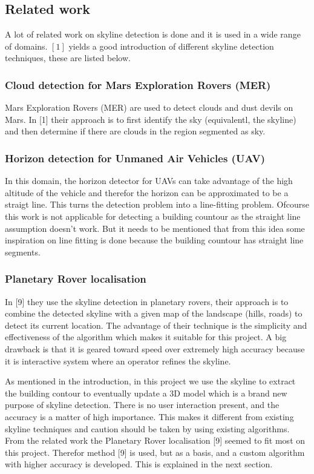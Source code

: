 \documentclass[10pt]{article}
\begin{document}
 \subsection{Related work}
A lot of related work on skyline detection is done and it is used in a wide
range of domains. $[1]$ yields a good introduction of different skyline
detection techniques, these are listed below.

\subsubsection{Cloud detection for Mars Exploration Rovers (MER)}
Mars Exploration Rovers (MER) are used to detect clouds and dust devils on Mars.
In [1] their approach is to first identify the sky (equivalentl, the skyline)
and then determine if there are clouds in the region segmented as sky.

\subsubsection{Horizon detection for Unmaned Air Vehicles (UAV)}
In this domain, the horizon detector for UAVs can take advantage of the high
altitude of the vehicle and therefor the horizon can be approximated to be a
straigt line.  This turns the detection problem into a line-fitting problem.
Ofcourse this work is not applicable for detecting a building countour as the
straight line assumption doesn't work. But it needs to be mentioned that from this
idea some inspiration on line fitting is done because the building countour has
straight line segments.

\subsubsection{Planetary Rover localisation}
In [9] they use the skyline detection in planetary rovers, their approach is to
combine the detected skyline with a given map of the landscape (hills, roads) to
detect its current location. 
The advantage of their technique is the simplicity and effectiveness of the
algorithm which makes it suitable for this project.  A big drawback is that it
is geared toward speed over extremely high accuracy because it is 
interactive system where an operator refines the skyline.

As mentioned in the introduction, in this project we use the skyline to extract
the building contour to eventually update a 3D model which is a brand new
purpose of skyline detection.  There is no user interaction present, and the
accuracy is a matter of high importance.  This makes it different from existing
skyline techniques and caution should be taken by using existing algorithms.
From the related work the Planetary Rover localisation [9] seemed to fit most on
this project.  Therefor method [9] is used, but as a basis, and a custom
algorithm with higher accuracy is developed. This is explained in the next
section.
\end{document}
